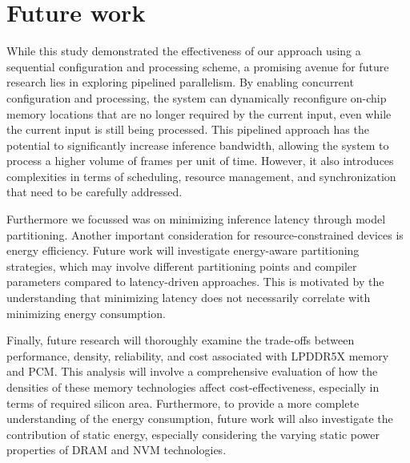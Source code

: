 \section{Future work}
While this study demonstrated the effectiveness of our approach using a sequential configuration and processing scheme, a promising avenue for future research lies in exploring pipelined parallelism.
By enabling concurrent configuration and processing, the system can dynamically reconfigure on-chip memory locations that are no longer required by the current input, even while the current input is still being processed.
This pipelined approach has the potential to significantly increase inference bandwidth, allowing the system to process a higher volume of frames per unit of time.
However, it also introduces complexities in terms of scheduling, resource management, and synchronization that need to be carefully addressed.

Furthermore we focussed was on minimizing inference latency through model partitioning.
Another important consideration for resource-constrained devices is energy efficiency.
Future work will investigate energy-aware partitioning strategies, which may involve different partitioning points and compiler parameters compared to latency-driven approaches.
This is motivated by the understanding that minimizing latency does not necessarily correlate with minimizing energy consumption.

Finally, future research will thoroughly examine the trade-offs between performance, density, reliability, and cost associated with LPDDR5X memory and PCM.
This analysis will involve a comprehensive evaluation of how the densities of these memory technologies affect cost-effectiveness, especially in terms of required silicon area.
Furthermore, to provide a more complete understanding of the energy consumption, future work will also investigate the contribution of static energy, especially considering the varying static power properties of DRAM and NVM technologies.

